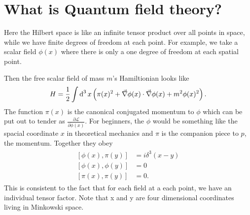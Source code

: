 \section{What is Quantum field theory? \checkmark} \label{QFT}
	Here the Hilbert space is like an infinite tensor product over all points in space, while we have finite degrees of freedom at each point. 
For example, we take a scalar field $\phi(x)$ where there is only a one degree of freedom at each spatial point. 

	Then the free scalar field of mass $m$'s Hamiltionian looks like
		\begin{equation}
			H=\frac{1}{2}\int \operatorname{d}^3 x \left(\pi(x)^2 + \vec{\nabla}\phi(x) \cdot \vec{\nabla}\phi(x) + m^2\phi(x)^2 \right).
		\end{equation}
	The function $\pi(x)$ is the canonical conjugated momentum to $\phi$ which can be put out to tender as $\frac{\partial \mathscr{L}}{\partial \dot{\phi}(x)}$. For beginners, the $\phi$ would be something like the spacial coordinate $x$ in theoretical mechanics and $\pi$ is the companion piece to $p$, the momentum.
	Together they obey
		\begin{align}
			\begin{split}
				[\phi(x),\pi(y)]&=i \delta^3(x-y) \\
				[\phi(x),\phi(y)]&=0 \\
				[\pi(x),\pi(y)]&=0.
			\end{split}
		\end{align}
	This is consistent to the fact that for each field at a each point, we have an individual tensor factor. Note that x and y are four dimensional coordinates living in Minkowski space.
			
